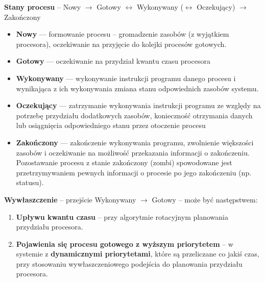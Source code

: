 \documentclass[main.tex]{subfiles}
\begin{document}
    \noindent \textbf{Stany procesu} -- Nowy $\rightarrow$ Gotowy $\leftrightarrow$ Wykonywany
    ($\leftrightarrow$ Oczekujący) $\rightarrow$ Zakończony
    \begin{itemize}[noitemsep]
        \item \textbf{Nowy} — formowanie procesu -- gromadzenie zasobów (z wyjątkiem procesora),
        oczekiwanie na przyjęcie do kolejki procesów gotowych.

        \item \textbf{Gotowy} — oczekiwanie na przydział kwantu czasu procesora

        \item \textbf{Wykonywany} — wykonywanie instrukcji programu danego procesu i wynikająca z ich wykonywania zmiana
        stanu odpowiednich zasobów systemu.

        \item \textbf{Oczekujący} — zatrzymanie wykonywania instrukcji programu ze względy na potrzebę przydziału
        dodatkowych zasobów, konieczność otrzymania danych lub osiągnięcia odpowiedniego stanu przez otoczenie procesu

        \item \textbf{Zakończony} — zakończenie wykonywania programu, zwolnienie większości zasobów i oczekiwanie na
        możliwość przekazania informacji o zakończeniu.
        Pozostawanie procesu z stanie zakończony (zombi) spowodowane jest przetrzymywaniem pewnych informacji o
        procesie po jego zakończeniu (np. statusu).
    \end{itemize}

    \noindent \textbf{Wywłaszczenie} -- przejście Wykonywany $\rightarrow$ Gotowy -- może być następstwem:
    \begin{enumerate}[noitemsep]
        \item \textbf{Upływu kwantu czasu} -- przy algorytmie rotacyjnym planowania przydziału procesora.
        \item \textbf{Pojawienia się procesu gotowego z wyższym priorytetem} -- w systemie z \textbf{dynamicznymi
        priorytetami}, które są przeliczane co jakiś czas, przy stosowaniu wywłaszczeniowego podejścia do planowania
        przydziału procesora.
    \end{enumerate}
\end{document}
